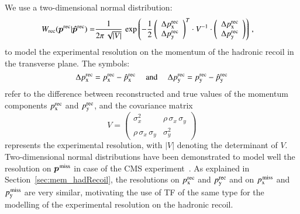 We use a two-dimensional normal distribution:
\begin{align}
W_{\textrm{rec}}( \bm{p}^{\textrm{rec}} | \bm{\hat{p}}^{\textrm{rec}} ) = & 
  \frac{1}{2\pi \, \sqrt{\vert V \vert}} \, \exp \left( -\frac{1}{2}
  \left( \begin{array}{c} \Delta p_{\textrm{x}}^{\textrm{rec}} \\ \Delta p_{\textrm{y}}^{\textrm{rec}} \end{array} \right)^{T}
  \cdot V^{-1} \cdot
   \left( \begin{array}{c} \Delta p_{\textrm{x}}^{\textrm{rec}} \\ \Delta p_{\textrm{y}}^{\textrm{rec}} \end{array} \right)
  \right) \, ,
\label{eq:tf_hadRecoil}
\end{align}
to model the experimental resolution on the momentum of
the hadronic recoil in the transverse plane.
The symbols:
\begin{equation}
\Delta p_{\textrm{x}}^{\textrm{rec}} = p_{\textrm{x}}^{\textrm{rec}} - \hat{p}_{\textrm{x}}^{\textrm{rec}} \quad \mbox{ and } \quad
\Delta p_{\textrm{y}}^{\textrm{rec}} = p_{\textrm{y}}^{\textrm{rec}} - \hat{p}_{\textrm{y}}^{\textrm{rec}} 
\label{eq:tf_hadRecoil_delta}
\end{equation}
refer to the difference between reconstructed and true values of the
momentum components $p_{\textrm{x}}^{\textrm{rec}}$ and $p_{\textrm{y}}^{\textrm{rec}}$,
and the covariance matrix
\begin{equation}
V = \left( \begin{array}{cc} \sigma_{x}^{2} & \rho \, \sigma_{x} \, \sigma_{y} \\ \rho \, \sigma_{x} \, \sigma_{y} & \sigma_{y}^{2} \end{array} \right) 
\label{eq:tf_hadRecoil_V}
\end{equation}
represents the experimental resolution,
with $\vert V \vert$ denoting the determinant of $V$.
Two-dimensional normal distributions have been demonstrated to model well the resolution on $\bm{p}^{\textrm{\kern0.10em miss}}$ in case of the CMS experiment~\cite{CMS-JME-10-009,CMS-JME-13-003}.
As explained in Section~\ref{sec:mem_hadRecoil}, the resolutions on $p_{\textrm{x}}^{\textrm{rec}}$ and $p_{\textrm{y}}^{\textrm{rec}}$ and on $p_{\textrm{x}}^{\textrm{\kern0.10em miss}}$ and $p_{\textrm{y}}^{\textrm{\kern0.10em miss}}$ are very similar,
motivating the use of TF of the same type for the modelling of the experimental resolution on the hadronic recoil.

